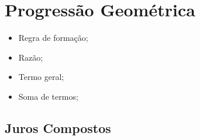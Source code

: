 \chapter{Progressão Geométrica}
\begin{itemize}
 \item Regra de formação;
 \item Razão;
 \item Termo geral;
 \item Soma de termos;
\end{itemize}

\section{Juros Compostos}